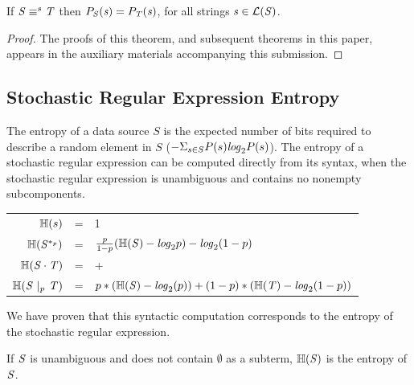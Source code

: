 \documentclass[acmsmall,screen,anonymous]{acmart}
\begin{document}
\begin{theorem}
  If $\mathit{S} \equiv^s \mathit{T}$ then $P_{\mathit{S}}(\mathit{s}) =
  P_{\mathit{T}}(\mathit{s})$, for all strings $\mathit{s} \in \mathcal{L}(\mathit{S})$.
\end{theorem}
\begin{proof}
  The proofs of this theorem, and subsequent theorems in this paper, appears in
  the auxiliary materials accompanying this submission.
\end{proof}

\subsection{Stochastic Regular Expression Entropy}
The entropy of a data source $S$ is the expected number of bits required to
describe a random element in $S$ ($-\Sigma_{s\in S}P(s)\mathit{log}_2P(s)$). The entropy
of a stochastic regular expression can be computed directly from its syntax,
when the stochastic regular expression is unambiguous and contains no nonempty
subcomponents.
\begin{center}
  \begin{tabular}{rcl}
    $\mathbb{H}(s)$
    & =
    & 1\\
    
    $\mathbb{H}(\mathit{S}^{*_{p}})$
    & =
    & $\frac{p}{1-p}(\mathbb{H}(\mathit{S}) - \mathit{log}_2p)
      - \mathit{log}_2(1-p)$\\
    
    $\mathbb{H}({\mathit{S}\cdot\mathit{T}})$
    & =
    & \EntropyOf{\Regex} + \EntropyOf{\RegexAlt}\\
    
    $\mathbb{H}(\mathit{S}~|_{p}~\mathit{T})$
    & =
    & $p*(\mathbb{H}(\mathit{S}) - \mathit{log}_2(p)) + (1-p)*(\mathbb{H}(\mathit{T}) - \mathit{log}_2(1-p))$\\
  \end{tabular}
\end{center}
We have proven that this syntactic computation corresponds to the entropy of the
stochastic regular expression.

\begin{theorem}
  \label{thm:correct_entropy}
  If $\mathit{S}$ is unambiguous and does not contain $\emptyset$ as a subterm,
  $\mathbb{H}(\mathit{S})$ is the entropy of $\mathit{S}$.
\end{theorem}
\end{document}
